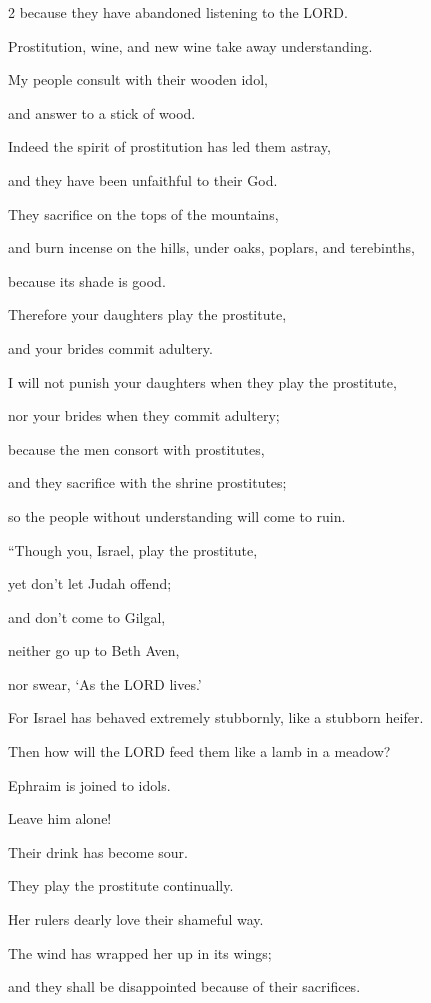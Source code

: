 \begin{multicols}{2}
because they have abandoned listening to the LORD.

\myverse{}Prostitution, wine, and new wine take away understanding.

\myverse{}My people consult with their wooden idol,

and answer to a stick of wood.

Indeed the spirit of prostitution has led them astray,

and they have been unfaithful to their God.

\myverse{}They sacrifice on the tops of the mountains,

and burn incense on the hills, under oaks, poplars, and terebinths,

because its shade is good.

Therefore your daughters play the prostitute,

and your brides commit adultery.

\myverse{}I will not punish your daughters when they play the prostitute,

nor your brides when they commit adultery;

because the men consort with prostitutes,

and they sacrifice with the shrine prostitutes;

so the people without understanding will come to ruin.


\vspace{\baselineskip} \myverse{}“Though you, Israel, play the prostitute,

yet don’t let Judah offend;

and don’t come to Gilgal,

neither go up to Beth Aven,

nor swear, ‘As the LORD lives.’

\myverse{}For Israel has behaved extremely stubbornly, like a stubborn
heifer.

Then how will the LORD feed them like a lamb in a meadow?

\myverse{}Ephraim is joined to idols.

Leave him alone!

\myverse{}Their drink has become sour.

They play the prostitute continually.

Her rulers dearly love their shameful way.

\myverse{}The wind has wrapped her up in its wings;

and they shall be disappointed because of their sacrifices.



\end{multicols}
